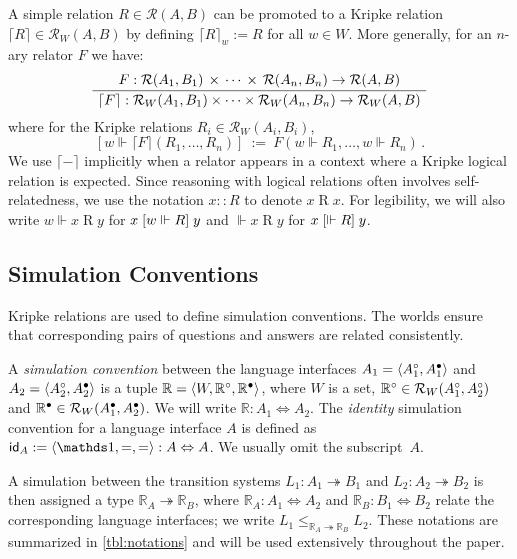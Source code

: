 \documentclass[sigplan,screen]{acmart}
\begin{document}
A simple relation $R \in \mathcal{R}(A, B)$
can be promoted to a Kripke relation
$\lceil R \rceil \in \mathcal{R}_W(A, B)$
by defining $\lceil R \rceil_w := R$ for all $w \in W$.
More generally, for an $n$-ary relator $F$ we have:
\[
  \AxiomC{$
    F :
      \mathcal{R}(A_1, B_1) \,\times\,\cdots\,\times\,\mathcal{R}(A_n, B_n)
      \rightarrow \mathcal{R}(A, B)$}
  \UnaryInfC{$
    \lceil F \rceil :
      \mathcal{R}_W(A_1, B_1) \times \cdots \times \mathcal{R}_W(A_n, B_n)
      \rightarrow \mathcal{R}_W(A, B)$}
  \DisplayProof
\]
where for the Kripke relations $R_i \in \mathcal{R}_W(A_i, B_i)$,
\[
  [w \Vdash \lceil F \rceil (R_1, \ldots, R_n)] \: := \:
    F(w \Vdash R_1, \ldots, w \Vdash R_n)
  \,.
\]
We use $\lceil - \rceil$ implicitly
when a relator appears in a context where
a Kripke logical relation is expected.
Since reasoning with logical relations
often involves self-relatedness,
we use the notation
$x :: R$ to denote $x \mathrel{R} x$.
For legibility, we will also write
$w \Vdash x \mathrel{R} y$ for $x \mathrel{[{w \Vdash R}]} y$
and $\Vdash x \mathrel{R} y$ for $x \mathrel{[{\Vdash R}]} y$.


\subsection{Simulation Conventions} \label{sec:simconv} %

Kripke relations are used
to define simulation conventions.
The worlds ensure that corresponding pairs of
questions and answers are related consistently.

\begin{definition} \label{def:simconv} %
A \emph{simulation convention} between the language interfaces
$A_1 = \langle A_1^\circ, A_1^\bullet \rangle$ and
$A_2 = \langle A_2^\circ, A_2^\bullet \rangle$
is a tuple $\mathbb{R} = \langle W, \mathbb{R}^\circ, \mathbb{R}^\bullet \rangle$,
where $W$ is a set,
$\mathbb{R}^\circ \in \mathcal{R}_W(A_1^\circ, A_2^\circ)$
and $\mathbb{R}^\bullet \in \mathcal{R}_W(A_1^\bullet, A_2^\bullet)$.
We will write $\mathbb{R} : A_1 \Leftrightarrow A_2$.
The \emph{identity} simulation convention
for a language interface $A$
is defined as
$\kw{id}_A := \langle \unitset, {=}, {=} \rangle
  : A \Leftrightarrow A$.
We usually omit the subscript~$A$.
\end{definition}

A simulation between the transition systems
$L_1 : A_1 \twoheadrightarrow B_1$ and
$L_2 : A_2 \twoheadrightarrow B_2$
is then assigned a type $\mathbb{R}_A \twoheadrightarrow \mathbb{R}_B$,
where %
$\mathbb{R}_A : A_1 \Leftrightarrow A_2$ and
$\mathbb{R}_B : B_1 \Leftrightarrow B_2$
relate the corresponding language interfaces;
we write
$L_1 \le_{\mathbb{R}_A \twoheadrightarrow \mathbb{R}_B} L_2$.
These notations are summarized in \autoref{tbl:notations}
and will be used extensively throughout the paper.
\end{document}
